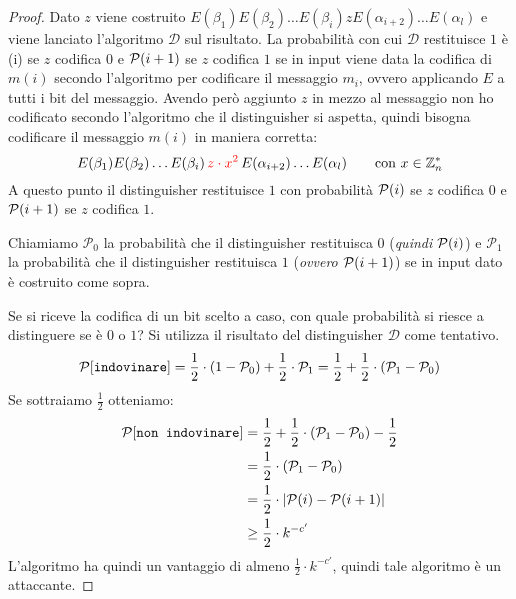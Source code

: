 \begin{proof}
Dato $z$ viene costruito $E(\beta_1)E(\beta_2)\dots E(\beta_i)zE(\alpha_{i+2})\dots E(\alpha_l)$ e viene lanciato 
l'algoritmo $\mathcal{D}$ sul risultato. La probabilità con cui $\mathcal{D}$ restituisce $1$ è \probP(i) se $z$
codifica $0$ e $\text{$\mathcal{P}$}(i+1)$ se $z$ codifica $1$ se in input viene data la codifica di $m(i)$ secondo 
l'algoritmo per codificare il messaggio $m_i$, ovvero applicando $E$ a tutti i bit del messaggio.
Avendo però aggiunto $z$ in mezzo al messaggio non ho codificato secondo l'algoritmo che il distinguisher
si aspetta, quindi bisogna codificare il messaggio $m(i)$ in maniera corretta:
\[
  E(\beta_1)E(\beta_2)\dots E(\beta_i)\,\textcolor{red}{z \cdot x^2}\,E(\alpha_{i+2})\dots E(\alpha_l)\qquad \text{con } 
  x \in \mathbb{Z}_n^*
\]
A questo punto il distinguisher restituisce $1$ con probabilità $\text{$\mathcal{P}$}(i)$ se $z$
codifica $0$ e $\text{$\mathcal{P}$}(i+1)$ se $z$ codifica $1$.

Chiamiamo $\mathcal{P}_0$ la probabilità che il distinguisher restituisca $0$ (\textit{quindi $\text{$\mathcal{P}$}(i)$}) e 
$\mathcal{P}_1$ la probabilità che il distinguisher restituisca $1$ (\textit{ovvero $\text{$\mathcal{P}$}(i+1)$}) se in input dato è costruito come sopra.

Se si riceve la codifica di un bit scelto a caso, con quale probabilità si riesce a distinguere se è $0$ o $1$?
Si utilizza il risultato del distinguisher $\mathcal{D}$ come tentativo.
\[
  \text{$\mathcal{P}$}[\texttt{indovinare}] = \frac{1}{2} \cdot (1 - \mathcal{P}_0) + \frac{1}{2} \cdot \mathcal{P}_1 = 
  \frac{1}{2} + \frac{1}{2} \cdot (\mathcal{P}_1 - \mathcal{P}_0)
\]
Se sottraiamo $\frac{1}{2}$ otteniamo:
  \begin{align*}
    \text{$\mathcal{P}$}[\texttt{non indovinare}] &= \frac{1}{2} + \frac{1}{2} \cdot (\mathcal{P}_1 -
  \mathcal{P}_0) - \frac{1}{2} \\
  &= \frac{1}{2} \cdot (\mathcal{P}_1 - \mathcal{P}_0) \\
  &= \frac{1}{2} \cdot |\text{$\mathcal{P}$}(i) - \text{$\mathcal{P}$}(i+1)| \\
  &\geq \frac{1}{2} \cdot k^{-c'}
  \end{align*}
L'algoritmo ha quindi un vantaggio di almeno $\frac{1}{2} \cdot k^{-c'}$, quindi tale algoritmo è 
un attaccante.
\end{proof}